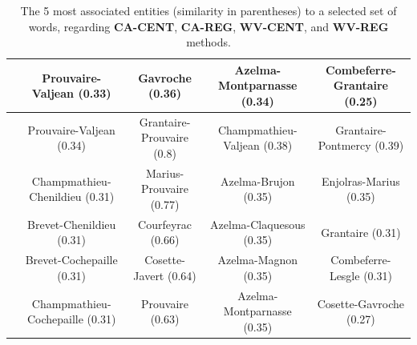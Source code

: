 \documentclass[
twocolumn,
]{ceurart}
\begin{document}
\begin{table}[!bh]
{\begin{tabular}{|c|c|c|c|c|}
		& Prouvaire-Valjean (0.33) & Gavroche (0.36) & Azelma-Montparnasse (0.34) & Combeferre-Grantaire (0.25) \\ 
		\hline
		\hline
		\parbox[t]{2mm}{} & Prouvaire-Valjean (0.34) & Grantaire-Prouvaire (0.8) & Champmathieu-Valjean (0.38) & Grantaire-Pontmercy (0.39) \\
		& Champmathieu-Chenildieu (0.31) & Marius-Prouvaire (0.77) & Azelma-Brujon (0.35) & Enjolras-Marius (0.35) \\
		& Brevet-Chenildieu (0.31) & Courfeyrac (0.66) & Azelma-Claquesous (0.35) & Grantaire (0.31) \\
		& Brevet-Cochepaille (0.31) & Cosette-Javert (0.64) & Azelma-Magnon (0.35) & Combeferre-Lesgle (0.31) \\
		& Champmathieu-Cochepaille (0.31) & Prouvaire (0.63) & Azelma-Montparnasse (0.35) & Cosette-Gavroche (0.27) \\ \hline
	\end{tabular}
	}
	\label{CA_CENT_obj_words}
	\caption{The 5 most associated entities (similarity in parentheses) to a selected set of words, regarding \textbf{CA-CENT}, \textbf{CA-REG}, \textbf{WV-CENT}, and \textbf{WV-REG} methods.}
\end{table}


\end{document}

